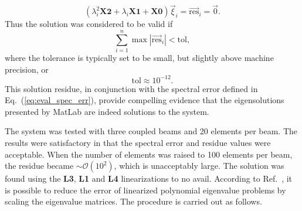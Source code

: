 \begin{equation}
(\lambda_i^2\mathbf{X2}+\lambda_i\mathbf{X1}+\mathbf{X0})\vec\xi_i=\vec{\text{res}}_i=\vec 0.
\end{equation}
Thus the solution was considered to be valid if
\begin{equation}
\sum_{i=1}^{n}\max|\vec{\text{res}}_i|<\text{tol},
\end{equation}
where the tolerance is typically set to be small, but slightly above machine precision, or
\begin{equation}
\text{tol}\approx 10^{-12}.
\end{equation}
This solution residue, in conjunction with the spectral error defined in Eq.~(\ref{eq:eval_spec_err}), provide compelling evidence that the eigensolutions presented by MatLab are indeed solutions to the system. 

The system was tested with three coupled beams and 20 elements per beam. The results were satisfactory in that the spectral error and residue values were acceptable. When the number of elements was raised to 100 elements per beam, the residue became  $\sim\mathcal{O}(10^{2})$, which is unacceptably large. The solution was found using the \textbf{L3}, \textbf{L1} and \textbf{L4} linearizations to no avail. According to Ref.~\cite{betcke2008optimal}, it is possible to reduce the error of linearized polynomial eigenvalue problems by scaling the eigenvalue matrices. The procedure is carried out as follows.

